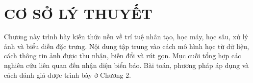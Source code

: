 \chapter{CƠ SỞ LÝ THUYẾT}
\label{chap:cosolythuyet}

Chương này trình bày kiến thức nền về trí tuệ nhân tạo, học máy, học sâu, xử lý ảnh và biểu diễn đặc trưng. Nội dung tập trung vào cách mô hình học từ dữ liệu, cách thông tin ảnh được thu nhận, biến đổi và rút gọn. Mục cuối tổng hợp các nghiên cứu liên quan đến nhận diện biển báo. Bài toán, phương pháp áp dụng và cách đánh giá được trình bày ở Chương 2.




